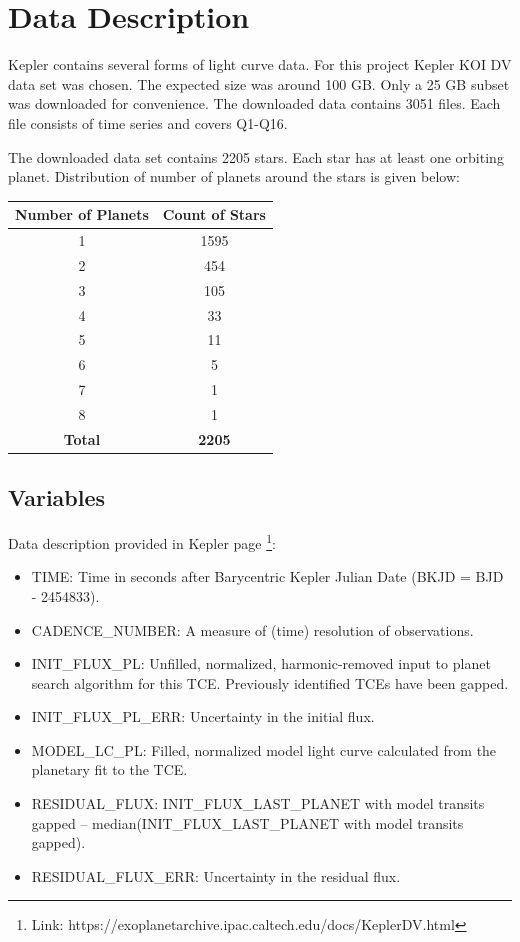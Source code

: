 \documentclass[%
aip,
amsmath,amssymb,
reprint,%
]{revtex4-1}
\begin{document}
\section{Data Description}

Kepler contains several forms of light curve data. For this project Kepler KOI DV data set was chosen. The expected size was around 100 GB. Only a 25 GB subset was downloaded for convenience. The downloaded data contains 3051 files. Each file consists of time series and covers Q1-Q16.

The downloaded data set contains 2205 stars. Each star has at least one orbiting planet. Distribution of number of planets around the stars is given below:

\begin{center}
 \begin{tabular}{| c | c |} 
 \hline
 \textbf{Number of Planets} & \textbf{Count of Stars}\\ [0.5 ex]
 \hline
 1 & 1595 \\ 
 \hline
 2 & 454 \\
 \hline
 3 & 105 \\
 \hline
 4 & 33 \\
 \hline
 5 & 11 \\
 \hline
 6 & 5 \\
 \hline
 7 & 1 \\
 \hline
 8 & 1 \\
 \hline
 \textbf{Total} & \textbf{2205} \\ [1ex] 
 \hline
\end{tabular}
\end{center}


\subsection{Variables}

Data description provided in Kepler page \footnote{Link: https://exoplanetarchive.ipac.caltech.edu/docs/KeplerDV.html}:

\begin{itemize}
  \item TIME: Time in seconds after Barycentric Kepler Julian Date (BKJD = BJD - 2454833).
  \item CADENCE\_NUMBER: A measure of (time) resolution of observations.
  \item INIT\_FLUX\_PL: Unfilled, normalized, harmonic-removed input to planet search algorithm for this TCE. Previously identified TCEs have been gapped.
  \item INIT\_FLUX\_PL\_ERR: Uncertainty in the initial flux.
  \item MODEL\_LC\_PL: Filled, normalized model light curve calculated from the planetary fit to the TCE.
  \item RESIDUAL\_FLUX: INIT\_FLUX\_LAST\_PLANET with model transits gapped – median(INIT\_FLUX\_LAST\_PLANET with model transits gapped).
  \item RESIDUAL\_FLUX\_ERR: Uncertainty in the residual flux.
\end{itemize}
\end{document}
